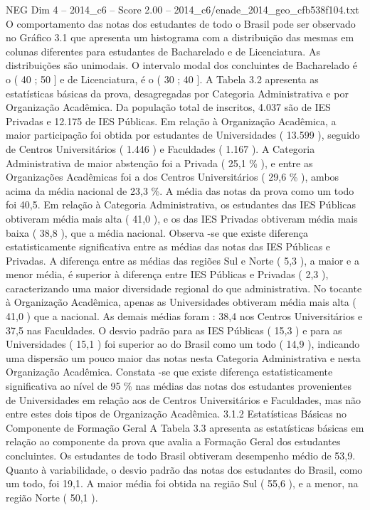 \begin{textsample}{NEG Dim 4 – 2014\_c6 – Score 2.00 – 2014\_c6/enade\_2014\_geo\_cfb538f104.txt}
O comportamento das notas dos estudantes de todo o Brasil pode ser observado no Gráfico 3.1 que apresenta um histograma com a distribuição das mesmas em colunas diferentes para estudantes de Bacharelado e de Licenciatura.
As distribuições são unimodais.
O intervalo modal dos concluintes de Bacharelado é o ( 40 ; 50 ] e de Licenciatura, é o ( 30 ; 40 ].
A Tabela 3.2 apresenta as estatísticas básicas da prova, desagregadas por Categoria Administrativa e por Organização Acadêmica.
Da população total de inscritos, 4.037 são de IES Privadas e 12.175 de IES Públicas.
Em relação à Organização Acadêmica, a maior participação foi obtida por estudantes de Universidades ( 13.599 ), seguido de Centros Universitários ( 1.446 ) e Faculdades ( 1.167 ).
A Categoria Administrativa de maior abstenção foi a Privada ( 25,1 \% ), e entre as Organizações Acadêmicas foi a dos Centros Universitários ( 29,6 \% ), ambos acima da média nacional de 23,3 \%.
A média das notas da prova como um todo foi 40,5.
Em relação à Categoria Administrativa, os estudantes das IES Públicas obtiveram média mais alta ( 41,0 ), e os das IES Privadas obtiveram média mais baixa ( 38,8 ), que a média nacional.
Observa -se que existe diferença estatisticamente significativa entre as médias das notas das IES Públicas e Privadas.
A diferença entre as médias das regiões Sul e Norte ( 5,3 ), a maior e a menor média, é superior à diferença entre IES Públicas e Privadas ( 2,3 ), caracterizando uma maior diversidade regional do que administrativa.
No tocante à Organização Acadêmica, apenas as Universidades obtiveram média mais alta ( 41,0 ) que a nacional.
As demais médias foram : 38,4 nos Centros Universitários e 37,5 nas Faculdades.
O desvio padrão para as IES Públicas ( 15,3 ) e para as Universidades ( 15,1 ) foi superior ao do Brasil como um todo ( 14,9 ), indicando uma dispersão um pouco maior das notas nesta Categoria Administrativa e nesta Organização Acadêmica.
Constata -se que existe diferença estatisticamente significativa ao nível de 95 \% nas médias das notas dos estudantes provenientes de Universidades em relação aos de Centros Universitários e Faculdades, mas não entre estes dois tipos de Organização Acadêmica. 3.1.2 Estatísticas Básicas no Componente de Formação Geral A Tabela 3.3 apresenta as estatísticas básicas em relação ao componente da prova que avalia a Formação Geral dos estudantes concluintes.
Os estudantes de todo Brasil obtiveram desempenho médio de 53,9.
Quanto à variabilidade, o desvio padrão das notas dos estudantes do Brasil, como um todo, foi 19,1.
A maior média foi obtida na região Sul ( 55,6 ), e a menor, na região Norte ( 50,1 ).

\end{textsample}
